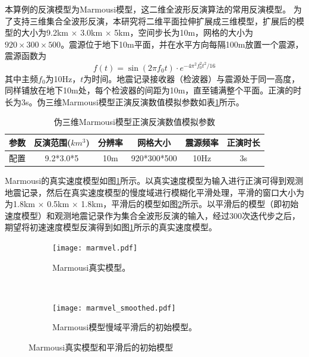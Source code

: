 本算例的反演模型为Marmousi模型，这二维全波形反演算法的常用反演模型。
为了支持三维集合全波形反演，本研究将二维平面拉伸扩展成三维模型，扩展后的模型的大小为9.2km $\times$ 3.0km $\times$ 5km，空间步长为10m，网格的大小为$920\times 300 \times 500$。震源位于地下10m平面，并在水平方向每隔100m放置一个震源，震源函数为
\begin{equation}
  f(t)=\sin(2\pi f_0t)\cdot e^{-4\pi^2f_0^2t^2/16}
\end{equation}
其中主频$f_0$为10Hz，$t$为时间。地震记录接收器（检波器）与震源处于同一高度，同样铺放在地下10m处，每个检波器的间距为10m，直至铺满整个平面。正演的时长为3s。伪三维Marmousi模型正演反演数值模拟参数如表\ref{tb:伪三维Marmousi模型正演反演数值模拟参数}所示。

\begin{table}[ht]
\centering
\caption{伪三维Marmousi模型正演反演数值模拟参数}
\label{tb:伪三维Marmousi模型正演反演数值模拟参数}
\begin{tabular}{cccccc}
\hline
参数 & 反演范围($km^3$) & 分辨率 & 网格大小        & 震源频率 & 正演时长 \\\hline
配置 & 9.2*3.0*5     & 10m   & 920*300*500   & 10Hz    & 3s  \\\hline
\end{tabular}
\end{table}

Marmousi的真实速度模型如图\ref{fig:Marmousi精确模型}所示。以真实速度模型为输入进行正演可得到观测地震记录，然后在真实速度模型的慢度域进行模糊化平滑处理，平滑的窗口大小为为1.8km $\times$ 0.5km $\times$ 1.8km，平滑后的模型如图\ref{fig:Marmousi模型慢域平滑后的初始模型}所示。以平滑后的模型（即初始速度模型）和观测地震记录作为集合全波形反演的输入，经过300次迭代步之后，期望将初速速度模型反演得到如图\ref{fig:Marmousi精确模型}所示的真实速度模型。

\begin{figure}[ht]
    \centering
    \begin{subfigure}[b]{0.5\textwidth}
        \centering
        \texttt{[image: marmvel.pdf]}
        \caption{Marmousi真实模型。}
        \label{fig:Marmousi精确模型}
    \end{subfigure}%
    ~
    \begin{subfigure}[b]{0.5\textwidth}
        \centering
        \texttt{[image: marmvel\_smoothed.pdf]}
        \caption{Marmousi模型慢域平滑后的初始模型。}
        \label{fig:Marmousi模型慢域平滑后的初始模型}
    \end{subfigure}
    \caption{Marmousi真实模型和平滑后的初始模型}
    \label{fig:Marmousi精确模型和平滑后的初始模型}
\end{figure}


